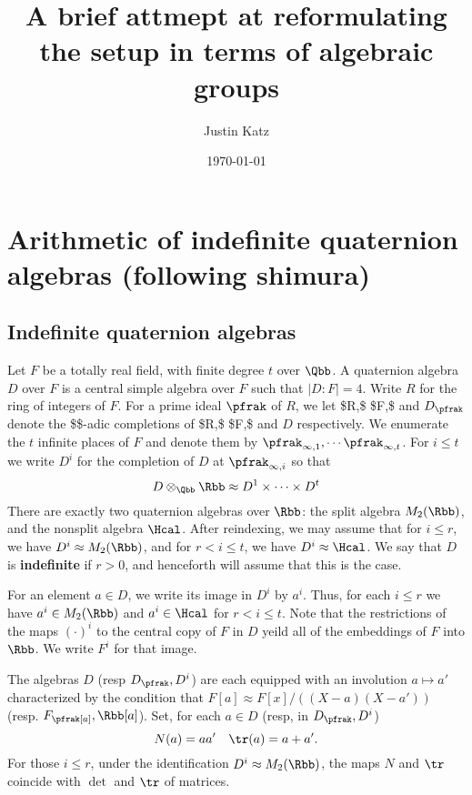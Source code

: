 \documentclass[11pt]{article}
\author{Justin Katz}
\date{\today}
\title{A brief attmept at reformulating the setup in terms of algebraic groups}
\begin{document}
\maketitle


\section{Arithmetic of indefinite quaternion algebras (following shimura)}
\label{sec:org8b2862a}
\subsection{Indefinite quaternion algebras}
\label{sec:orgef86b72}
Let \(F\) be a totally real field, with finite degree \(t\) over \(\Qbb\). A quaternion algebra \(D\) over \(F\) is a central simple algebra over \(F\) such that \(|D:F|=4\). Write \(R\) for the ring of integers of \(F\). For a
prime ideal \(\pfrak\) of \(R\), we let \$R\textsubscript{\pfrak},\$ \$F\textsubscript{\pfrak},\$ and \(D_\pfrak\) denote the \$\pfrak\$-adic completions of \$R,\$ \$F,\$ and \(D\) respectively. We enumerate the \(t\) infinite places of \(F\) and denote them by \(\pfrak_{\infty,1},\cdots \pfrak_{\infty,t}\). For \(i \leq t\) we write \(D^i\) for the completion of \(D\) at \(\pfrak_{\infty,i}\) so that
\[ D \otimes_\Qbb \Rbb \approx D^1 \times \cdots \times D^t \]
There are exactly two quaternion algebras over \(\Rbb\): the split algebra \(M_2(\Rbb)\), and the nonsplit algebra \(\Hcal\). After reindexing, we may assume that for \(i \leq r\), we have \(D^i \approx M_2(\Rbb)\), and for \(r < i \leq t\), we have \(D^i \approx \Hcal\). We say that \(D\) is \textbf{indefinite} if \(r>0\), and henceforth will assume that this is the case.

For an element \(a \in D\), we write its image in \(D^i\) by \(a^i\). Thus, for each \(i \leq r\) we have \(a^i \in M_2(\Rbb)\) and \(a^i \in \Hcal\) for \(r < i \leq t\). Note that the restrictions of the maps \((\cdot)^i\) to the central copy of \(F\) in  \(D\) yeild all of the embeddings of \(F\) into \(\Rbb\). We write \(F^i\) for that image. 

The algebras \(D\) (resp \(D_\pfrak,D^i\))  are each equipped with an involution \(a \mapsto a'\) characterized by the condition that \(F[a] \approx F[x]/ ((X-a)(X-a'))\) (resp. \(F_\pfrak[a], \Rbb[a]\)). Set, for each \(a \in D\) (resp, in \(D_\pfrak, D^i\))
\[ N(a) = aa' \quad \tr(a) = a + a'. \]
For those \(i\leq r\), under the identification \(D^i \approx M_2(\Rbb)\), the maps \(N\) and \(\tr\) coincide with \(\det\) and \(\tr\) of matrices.
\end{document}
